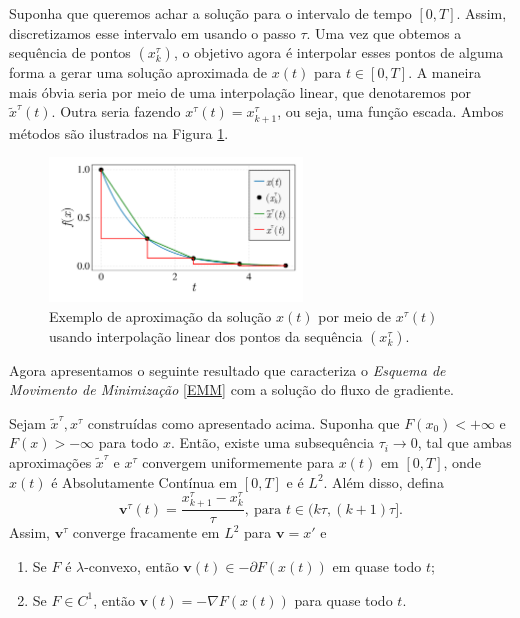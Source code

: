 Suponha que queremos achar a solução para o intervalo de tempo $[0,T]$. Assim,
discretizamos esse intervalo em usando o passo $\tau$.
Uma vez que obtemos a sequência de pontos $(x_k^\tau)$, o objetivo agora é interpolar
esses pontos de alguma forma a gerar uma solução aproximada de $x(t)$ para $t \in [0,T]$.
A maneira mais óbvia seria por meio de uma interpolação linear, que denotaremos por
$\tilde x^\tau(t)$. Outra seria fazendo $x^\tau(t) = x_{k+1}^\tau$, ou seja, uma função
escada. Ambos métodos são ilustrados na Figura \ref{fig:eulerinterpolacao}.
\begin{figure}[H]
\begin{center}
    \includegraphics[width=0.6\textwidth]{./Figures/eulerinterpolacao}
\end{center}
    \caption{Exemplo de aproximação da solução $x(t)$ por
    meio de $x^\tau(t)$ usando interpolação linear dos pontos da sequência $(x_k^\tau)$.}
    \label{fig:eulerinterpolacao}
\end{figure}

Agora apresentamos o seguinte resultado que caracteriza o
\textit{Esquema de Movimento de Minimização} \eqref{EMM}
com a solução do fluxo de gradiente.

\begin{theorem}
    Sejam $\tilde x^\tau, x^\tau$ construídas como apresentado acima. Suponha que
    $F(x_0)<+\infty$ e $F(x)>-\infty$ para todo $x$. Então, existe uma subsequência
    $\tau_i \to 0$, tal que ambas aproximações
    $\tilde x^\tau$ e $x^\tau$ convergem uniformemente para $x(t)$ em $[0,T]$, onde $x(t)$
    é Absolutamente Contínua em $[0,T]$ e é $L^2$. Além disso, defina
    \begin{equation}
        \bm v^\tau(t) = \frac{x_{k+1}^\tau - x_k^\tau}{\tau}, \ \text{para } t \in (k\tau,(k+1)\tau].
    \end{equation}
    Assim, $\bm v^\tau$ converge fracamente em $L^2$ para $\bm v = x'$ e
    \begin{enumerate}
        \item Se $F$ é $\lambda$-convexo, então $\bm v(t) \in -\partial F(x(t))$ em quase todo $t$;
        \item Se $F \in C^1$, então $\bm v(t) = - \nabla F(x(t))$ para quase todo $t$.
    \end{enumerate}
\end{theorem}

